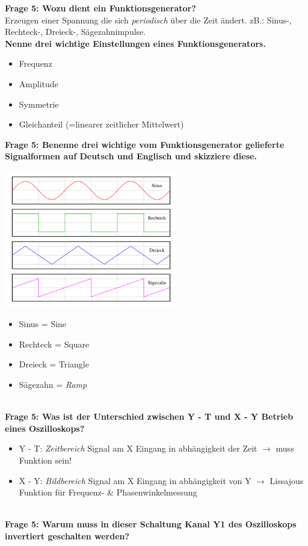 \documentclass[11pt,a4paper]{scrartcl}
\begin{document}
\textbf{Frage 5: Wozu dient ein Funktionsgenerator?}\\
Erzeugen einer Spannung die sich \textit{periodisch} über die Zeit ändert. zB.: Sinus-, Rechteck-, Dreieck-, Sägezahnimpulse.\\
\textbf{Nenne drei wichtige Einstellungen eines Funktionsgenerators.}
\begin{itemize}
	\item Frequenz
	\item Amplitude
	\item Symmetrie
	\item Gleichanteil (=linearer zeitlicher Mittelwert)
\end{itemize}
\textbf{Frage 5: Benenne drei wichtige vom Funktionsgenerator gelieferte Signalformen auf Deutsch und Englisch und skizziere diese.}\\
		\begin{minipage}{0.49\linewidth} 
      \includegraphics[height=6cm,keepaspectratio]{Funktionsgenerator_Wellenformen.png}
    \end{minipage} 
    \hfill 
    \begin{minipage}{0.49\linewidth} 
      \begin{itemize}
				\item Sinus = Sine
				\item Rechteck = Square
				\item Dreieck = Triangle
				\item Sägezahn = \textit{Ramp}
			\end{itemize}
    \end{minipage} \\
\textbf{Frage 5: Was ist der Unterschied zwischen Y - T und X - Y Betrieb eines Oszilloskops?}\\
\begin{itemize}
	\item Y - T: \textit{Zeitbereich} Signal am X Eingang in abhängigkeit der Zeit $\rightarrow$ muss Funktion sein!
	\item X - Y: \textit{Bildbereich} Signal am X Eingang in abhängigkeit von Y $\rightarrow$ Lissajous Funktion für Frequenz- \& Phasenwinkelmessung
\end{itemize}\\
\textbf{Frage 5: Warum muss in dieser Schaltung Kanal Y1 des Oszilloskops invertiert geschalten werden?}\\
\end{document}
